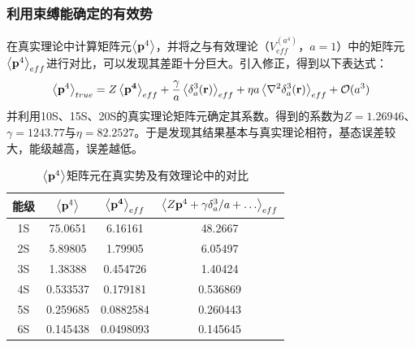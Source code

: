 \documentclass[hyperref,cs4size,titlepage,twoside]{ctexart}
\begin{document}
\subsubsection{利用束缚能确定的有效势}
在真实理论中计算矩阵元$\expval{\vb{p}^4}$，并将之与有效理论（$V_{eff}^{(a^4)}$，$a=1$）中的矩阵元$\expval{\vb{p}^4}_{eff}$进行对比，可以发现其差距十分巨大。引入修正，得到以下表达式\cite{Lepage}：
\begin{equation}\label{p4true}
  \expval{\vb{p}^4}_{true}=Z\expval{\vb{p^4}}_{eff}+\frac{\gamma}{a}\expval{\delta^3_a(\vb{r})}_{eff}+\eta a\expval{\laplacian{\delta^3_a(\vb{r})}}_{eff}+\mathcal{O}(a^3)
\end{equation}
并利用10S、15S、20S的真实理论矩阵元确定其系数。得到的系数为$Z=1.26946$、$\gamma=1243.77$与$\eta=82.2527$。于是发现其结果基本与真实理论相符，基态误差较大，能级越高，误差越低。
\begin{table}[!hbtp]
  \centering
  \begin{tabular}{|cccc|}
    \hline
    能级 & $\expval{\vb{p}^4}$ & $\expval{\vb{p^4}}_{eff}$ & $\expval{Z\vb{p}^4+\gamma \delta^3_a/a+\dots}_{eff}$ \\
    \hline
    1S & 75.0651 & 6.16161 & 48.2667 \\
    2S & 5.89805 & 1.79905 & 6.05497 \\
    3S & 1.38388 & 0.454726 & 1.40424 \\
    4S & 0.533537 & 0.179181 & 0.536869 \\
    5S & 0.259685 & 0.0882584 & 0.260443 \\
    6S & 0.145438 & 0.0498093 & 0.145645 \\
    \hline
  \end{tabular}
  \caption{$\expval{\vb{p}^4}$矩阵元在真实势及有效理论中的对比}\label{p4}
\end{table}
\end{document}
